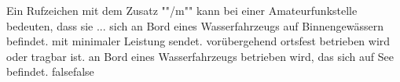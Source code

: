     {Ein Rufzeichen mit dem Zusatz ""/m"" kann bei einer Amateurfunkstelle bedeuten, dass sie ...}
    {sich an Bord eines Wasserfahrzeugs auf Binnengewässern befindet.}
    {mit minimaler Leistung sendet.}
    {vorübergehend ortsfest betrieben wird oder tragbar ist.}
    {an Bord eines Wasserfahrzeugs betrieben wird, das sich auf See befindet.}
    {false}{false}